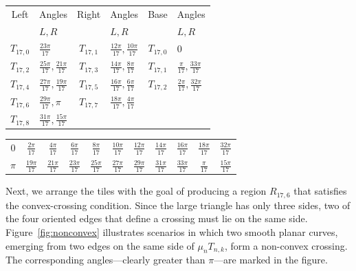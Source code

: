 \begin{center}
\renewcommand{\arraystretch}{1.5}
\label{tab:labels}
\begin{tabular}{| c | l | c | l | c | l |}
\hline
Left & Angles & Right & Angles & Base & Angles \\
& $L, R$ & & $L, R$ & & $L, R$ \\
\hline
$T_{17,0}$ & $\frac{23\pi}{17}$ & $T_{17,1}$ & $\frac{12\pi}{17}, \frac{10\pi}{17}$ & $T_{17,0}$ & $0$ \\
$T_{17,2}$ & $\frac{25\pi}{17}, \frac{21\pi}{17}$ & $T_{17,3}$ & $\frac{14\pi}{17}, \frac{8\pi}{17}$ & $T_{17,1}$ & $\frac{\pi}{17}, \frac{33\pi}{17}$ \\
$T_{17,4}$ & $\frac{27\pi}{17}, \frac{19\pi}{17}$ & $T_{17,5}$ & $\frac{16\pi}{17}, \frac{6\pi}{17}$ & $T_{17,2}$ & $\frac{2\pi}{17}, \frac{32\pi}{17}$ \\
$T_{17,6}$ & $\frac{29\pi}{17}, \pi$ & $T_{17,7}$ & $\frac{18\pi}{17}, \frac{4\pi}{17}$ & & \\
$T_{17,8}$ & $\frac{31\pi}{17}, \frac{15\pi}{17}$ & & & & \\
\hline
\end{tabular}
\end{center}


\begin{center}
\renewcommand{\arraystretch}{1.5}
\label{tab:partition}
\begin{tabular}{| c | c | c | c | c | c | c | c | c | c | c | }
\hline
$0$ & $\frac{2\pi}{17}$ & $\frac{4\pi}{17}$ & $\frac{6\pi}{17}$ & $\frac{8\pi}{17}$ & $\frac{10\pi}{17}$ & $\frac{12\pi}{17}$ & $\frac{14\pi}{17}$ & $\frac{16\pi}{17}$ & $\frac{18\pi}{17}$ & $\frac{32\pi}{17}$ \\ 
$\pi$ & $\frac{19\pi}{17}$ & $\frac{21\pi}{17}$ & $\frac{23\pi}{17}$ & $\frac{25\pi}{17}$ & $\frac{27\pi}{17}$ & $\frac{29\pi}{17}$ & $\frac{31\pi}{17}$ & $\frac{33\pi}{17}$ & $\frac{\pi}{17}$ & $\frac{15\pi}{17}$ \\
\hline
\end{tabular}
\end{center}

Next, we arrange the tiles with the goal of producing a region \(R_{17,6}\) that satisfies the convex-crossing condition. Since the large triangle has only three sides, two of the four oriented edges that define a crossing must lie on the same side. Figure~\ref{fig:nonconvex} illustrates scenarios in which two smooth planar curves, emerging from two edges on the same side of \(\mu_{n} T_{n,k}\), form a non-convex crossing. The corresponding angles---clearly greater than \(\pi\)---are marked in the figure.  

